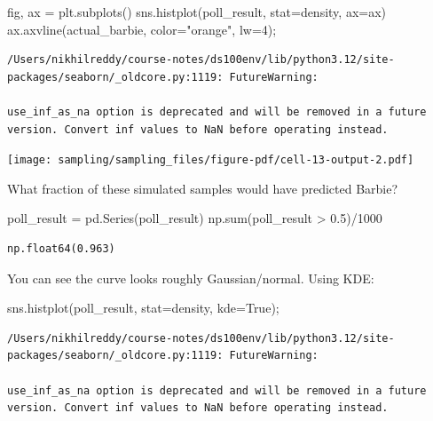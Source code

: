\documentclass[
  letterpaper,
  DIV=11,
  numbers=noendperiod]{scrreprt}
\newenvironment{Shaded}{\begin{snugshade}}{\end{snugshade}}
\newcommand{\BuiltInTok}[1]{\textcolor[rgb]{0.00,0.23,0.31}{#1}}
\newcommand{\DecValTok}[1]{\textcolor[rgb]{0.68,0.00,0.00}{#1}}
\newcommand{\FloatTok}[1]{\textcolor[rgb]{0.68,0.00,0.00}{#1}}
\newcommand{\NormalTok}[1]{\textcolor[rgb]{0.00,0.23,0.31}{#1}}
\newcommand{\OperatorTok}[1]{\textcolor[rgb]{0.37,0.37,0.37}{#1}}
\newcommand{\StringTok}[1]{\textcolor[rgb]{0.13,0.47,0.30}{#1}}
\newcommand{\VariableTok}[1]{\textcolor[rgb]{0.07,0.07,0.07}{#1}}
\begin{document}
\begin{Shaded}
\begin{Highlighting}[]
\NormalTok{fig, ax }\OperatorTok{=}\NormalTok{ plt.subplots()}
\NormalTok{sns.histplot(poll\_result, stat}\OperatorTok{=}\StringTok{\textquotesingle{}density\textquotesingle{}}\NormalTok{, ax}\OperatorTok{=}\NormalTok{ax)}
\NormalTok{ax.axvline(actual\_barbie, color}\OperatorTok{=}\StringTok{"orange"}\NormalTok{, lw}\OperatorTok{=}\DecValTok{4}\NormalTok{)}\OperatorTok{;}
\end{Highlighting}
\end{Shaded}

\begin{verbatim}
/Users/nikhilreddy/course-notes/ds100env/lib/python3.12/site-packages/seaborn/_oldcore.py:1119: FutureWarning:

use_inf_as_na option is deprecated and will be removed in a future version. Convert inf values to NaN before operating instead.
\end{verbatim}

\texttt{[image: sampling/sampling\_files/figure-pdf/cell-13-output-2.pdf]}

What fraction of these simulated samples would have predicted Barbie?

\begin{Shaded}
\begin{Highlighting}[]
\NormalTok{poll\_result }\OperatorTok{=}\NormalTok{ pd.Series(poll\_result)}
\NormalTok{np.}\BuiltInTok{sum}\NormalTok{(poll\_result }\OperatorTok{\textgreater{}} \FloatTok{0.5}\NormalTok{)}\OperatorTok{/}\DecValTok{1000}
\end{Highlighting}
\end{Shaded}

\begin{verbatim}
np.float64(0.963)
\end{verbatim}

You can see the curve looks roughly Gaussian/normal. Using KDE:

\begin{Shaded}
\begin{Highlighting}[]
\NormalTok{sns.histplot(poll\_result, stat}\OperatorTok{=}\StringTok{\textquotesingle{}density\textquotesingle{}}\NormalTok{, kde}\OperatorTok{=}\VariableTok{True}\NormalTok{)}\OperatorTok{;}
\end{Highlighting}
\end{Shaded}

\begin{verbatim}
/Users/nikhilreddy/course-notes/ds100env/lib/python3.12/site-packages/seaborn/_oldcore.py:1119: FutureWarning:

use_inf_as_na option is deprecated and will be removed in a future version. Convert inf values to NaN before operating instead.
\end{verbatim}
\end{document}
